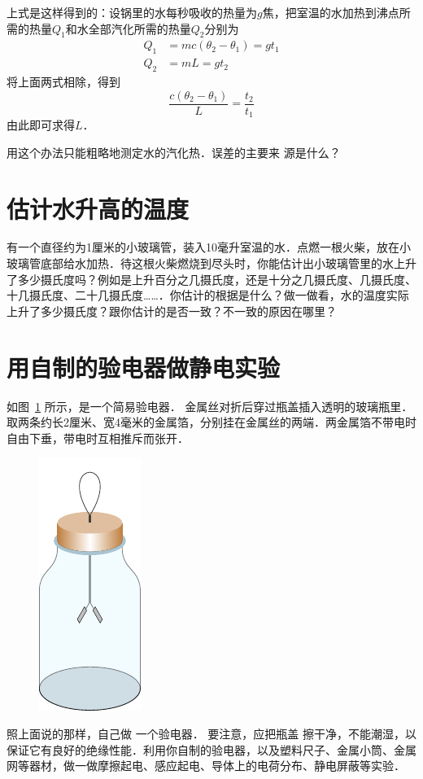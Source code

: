 上式是这样得到的：设锅里的水每秒吸收的热量为$g$焦，把室温的水加热到沸点所需的热量$Q_1$和水全部汽化所需的热量$Q_2$分别为
\[\begin{split}
    Q_1&=mc(\theta_2-\theta_1)=gt_1\\
Q_2&=mL=gt_2
\end{split}\]
将上面两式相除，得到
\[\frac{c(\theta_2-\theta_1)}{L}=\frac{t_2}{t_1}  \]
由此即可求得$L$．

用这个办法只能粗略地测定水的汽化热．误差的主要来
源是什么？

\section{估计水升高的温度}
有一个直径约为1厘米的小玻璃管，装入10毫升室温的水．点燃一根火柴，放在小玻璃管底部给水加热．待这根火柴燃烧到尽头时，你能估计出小玻璃管里的水上升了多少摄氏度吗？例如是上升百分之几摄氏度，还是十分之几摄氏度、几摄氏度、十几摄氏度、二十几摄氏度……．你估计的根据是什么？做一做看，水的温度实际上升了多少摄氏度？跟你估计的是否一致？不一致的原因在哪里？

\section{用自制的验电器做静电实验}
如图~\ref{fig_B_9-15} 所示，是一个简易验电器．
金属丝对折后穿过瓶盖插入透明的玻璃瓶里．
取两条约长2厘米、宽4毫米的金属箔，分别挂在金属丝的两端．两金属箔不带电时自由下垂，带电时互相推斥而张开．
\begin{figure}[htbp]
    \centering
    \includegraphics{fig/B/9-15.pdf}
    \caption{}\label{fig_B_9-15}
\end{figure}

照上面说的那样，自己做
一个验电器．
要注意，应把瓶盖
擦干净，不能潮湿，以保证它有良好的绝缘性能．利用你自制的验电器，以及塑料尺子、金属小筒、金属网等器材，做一做摩擦起电、感应起电、导体上的电荷分布、静电屏蔽等实验．

